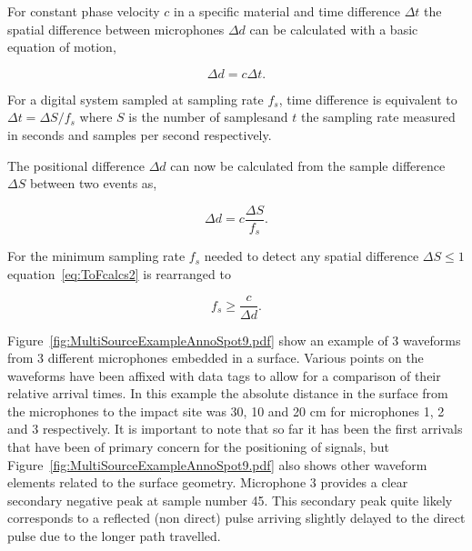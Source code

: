 For constant phase velocity $c$ in a specific material and time difference $\Delta t$ the spatial difference between microphones $\Delta d$ can be calculated with a basic equation of motion,

\begin{equation}\label{eq:ToFcalcs1}
\Delta d  = c \Delta t.
\end{equation}

For a digital system sampled at sampling rate $f_s$, \DIFaddbegin {}\DIFaddend time difference is equivalent to $\Delta t = \Delta S/f_s$ where $S$ is the number of samples\DIFaddbegin {}\DIFaddend and $t$ \DIFaddbegin {}\DIFaddend the sampling rate \DIFdelbegin {}\DIFdelend \DIFaddbegin {}\DIFaddend measured in seconds and samples per second respectively.

The positional difference $\Delta d$ can now be calculated from the sample difference $\Delta S$ between two events as,

\begin{equation}\label{eq:ToFcalcs2}
\Delta d  = c \frac{\Delta S}{f_s}.
\end{equation}

For the minimum sampling rate $f_s$ needed to detect any spatial difference $\Delta S \leq 1$\DIFaddbegin {}\DIFaddend equation~\ref{eq:ToFcalcs2} is rearranged to

\begin{equation}\label{eq:ToFcalcs3}
f_s  \geq \frac{c}{\Delta d}.
\end{equation}

Figure~\ref{fig:MultiSourceExampleAnnoSpot9.pdf} show an example of 3 waveforms from 3 different microphones embedded in a surface. Various points on the waveforms have been affixed with data tags to allow for a comparison of their relative arrival times. In this example the absolute distance in the surface from the microphones to the impact site was 30, 10 and 20 cm for microphones 1, 2 and 3 respectively. It is important to note that so far it has been the first arrivals that have been of primary concern for the positioning of signals, but Figure~\ref{fig:MultiSourceExampleAnnoSpot9.pdf} also shows other waveform elements related to the surface geometry. Microphone 3 provides a clear secondary negative peak at sample number 45. This secondary peak quite likely corresponds to a reflected (non direct) pulse arriving slightly delayed to the direct pulse due to the longer path travelled.

